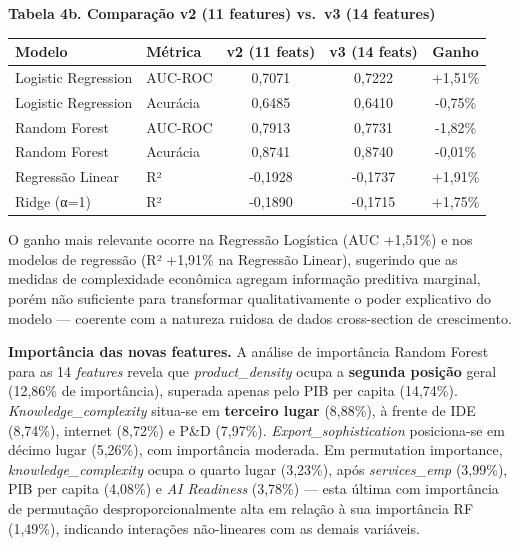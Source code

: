 \documentclass[
  brazilian,
  12pt,
]{article}
\newcounter{none} %
\begin{document}
\textbf{Tabela 4b. Comparação v2 (11 features) vs.~v3 (14 features)}

{\def\LTcaptype{none} %
\begin{longtable}[]{@{}llccc@{}}
\toprule\noalign{}
Modelo & Métrica & v2 (11 feats) & v3 (14 feats) & Ganho \\
\midrule\noalign{}
\endhead
\bottomrule\noalign{}
\endlastfoot
Logistic Regression & AUC-ROC & 0,7071 & 0,7222 & +1,51\% \\
Logistic Regression & Acurácia & 0,6485 & 0,6410 & -0,75\% \\
Random Forest & AUC-ROC & 0,7913 & 0,7731 & -1,82\% \\
Random Forest & Acurácia & 0,8741 & 0,8740 & -0,01\% \\
Regressão Linear & R² & -0,1928 & -0,1737 & +1,91\% \\
Ridge (α=1) & R² & -0,1890 & -0,1715 & +1,75\% \\
\end{longtable}
}

O ganho mais relevante ocorre na Regressão Logística (AUC +1,51\%) e nos modelos de regressão (R² +1,91\% na Regressão Linear), sugerindo que as medidas de complexidade econômica agregam informação preditiva marginal, porém não suficiente para transformar qualitativamente o poder explicativo do modelo --- coerente com a natureza ruidosa de dados cross-section de crescimento.

\textbf{Importância das novas features.} A análise de importância Random Forest para as 14 \emph{features} revela que \emph{product\_density} ocupa a \textbf{segunda posição} geral (12,86\% de importância), superada apenas pelo PIB per capita (14,74\%). \emph{Knowledge\_complexity} situa-se em \textbf{terceiro lugar} (8,88\%), à frente de IDE (8,74\%), internet (8,72\%) e P\&D (7,97\%). \emph{Export\_sophistication} posiciona-se em décimo lugar (5,26\%), com importância moderada. Em permutation importance, \emph{knowledge\_complexity} ocupa o quarto lugar (3,23\%), após \emph{services\_emp} (3,99\%), PIB per capita (4,08\%) e \emph{AI Readiness} (3,78\%) --- esta última com importância de permutação desproporcionalmente alta em relação à sua importância RF (1,49\%), indicando interações não-lineares com as demais variáveis.
\end{document}
